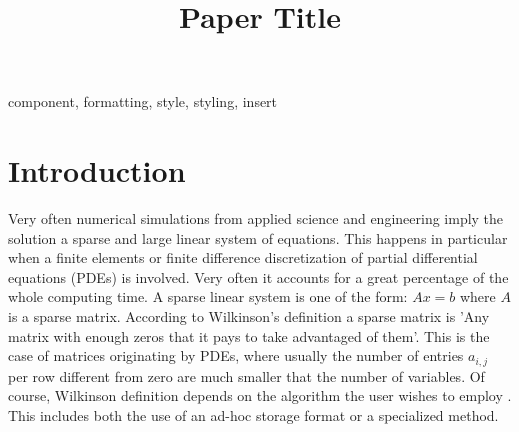 \documentclass[conference]{IEEEtran}
\begin{document}
\title{Paper Title
}


\maketitle

\begin{abstract}
 

\end{abstract}

\begin{IEEEkeywords}
component, formatting, style, styling, insert
\end{IEEEkeywords}

\section{Introduction}

Very often numerical simulations from applied science and engineering imply the solution a sparse and large linear system of equations. This happens in particular when a finite elements or finite difference discretization of partial differential equations (PDEs) is involved. Very often it accounts for a great percentage of the whole computing time. 
A sparse linear system is one of the form:
\begin{math} 
Ax = b
\end{math}
where $A$ is a sparse matrix. According to Wilkinson's definition a sparse matrix is 'Any matrix with enough zeros that it pays to take advantaged of them'. This is the case of matrices originating by PDEs, where usually the number of entries $a_{i,j}$ per row different from zero are much smaller that the number of variables. Of course, Wilkinson definition depends on the algorithm the user wishes to employ \cite{filippone2012object}. This includes both the use of an ad-hoc storage format or a specialized method.
\end{document}
